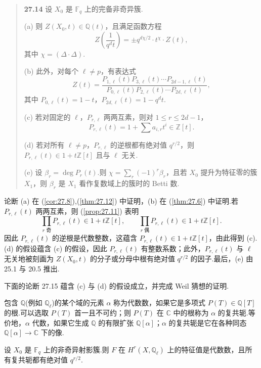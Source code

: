 \begin{quote}
\label{item:27.14}
\textbf{27.14} 设 $X_0$ 是 $\mathbb{F}_q$ 上的完备非奇异簇.

(a) 则 $Z(X_0, t) \in \mathbb{Q}(t)$，且满足函数方程
\[
Z\left( \frac{1}{q^{d}t} \right) = \pm q^{d\chi/2} \cdot t^{\chi} \cdot Z(t),
\]
其中 $\chi = (\Delta \cdot \Delta)$.

(b) 此外，对每个 $\ell \neq p$，有表达式
\[
Z(t) = \frac{P_{1, \ell}(t)P_{3, \ell}(t) \cdots P_{2d-1, \ell}(t)}{P_{0, \ell}(t)P_{2, \ell}(t) \cdots P_{2d, \ell}(t)},
\]
其中 $P_{0, \ell}(t) = 1 - t$，$P_{2d, \ell}(t) = 1 - q^{d}t$.

(c) 若对固定的 $\ell$，$P_{r, \ell}$ 两两互素，则对 $1 \leq r \leq 2d - 1$，
\[
P_{r, \ell}(t) = 1 + \sum a_{i, r}t^{i} \in \mathbb{Z}[t].
\]

(d) 若对所有 $\ell \neq p$，$P_{r, \ell}$ 的逆根都有绝对值 $q^{r/2}$，则 $P_{r, \ell}(t) \in 1 + t\mathbb{Z}[t]$ 且与 $\ell$ 无关.

(e) 设 $\beta_r = \deg P_r(t)$.则 $\chi = \sum_{r} (-1)^{r}\beta_r$，且若 $X_0$ 提升为特征零的簇 $X_1$，则 $\beta_r$ 是 $X_1$ 看作复数域上的簇时的 Betti 数.
\end{quote}

论断 (a) 在 (\ref{cor:27.8}),(\ref{thm:27.12}) 中证明，(b) 在 (\ref{thm:27.6}) 中证明.若 $P_{r, \ell}(t)$ 两两互素，则 (\ref{prop:27.11}) 表明
\[
\prod_{r \text{ 奇}} P_{r, \ell}(t) \in 1 + t\mathbb{Z}[t], \qquad \prod_{r \text{ 偶}} P_{r, \ell}(t) \in 1 + t\mathbb{Z}[t].
\]
因此 $P_{r, \ell}(t)$ 的逆根是代数整数，这蕴含 $P_{r, \ell}(t) \in 1 + t\mathbb{Z}[t]$，由此得到 (c).(d) 的假设蕴含 (c) 的假设，因此 $P_{r, \ell}(t)$ 有整数系数；此外，$P_{r, \ell}(t)$ 与 $\ell$ 无关地被刻画为 $Z(X_0, t)$ 的分子或分母中根有绝对值 $q^{r/2}$ 的因子.最后，(e) 由 25.1 与 20.5 推出.

下面的论断 27.15 蕴含 (c) 与 (d) 的假设成立，并完成 Weil 猜想的证明.

包含 $\mathbb{Q}$(例如 $\mathbb{Q}_{\ell}$)的某个域的元素 $\alpha$ 称为代数数，如果它是多项式 $P(T) \in \mathbb{Q}[T]$ 的根.可以选取 $P(T)$ 首一且不可约；则 $P(T)$ 在 $\mathbb{C}$ 中的根称为 $\alpha$ 的复共轭.等价地，$\alpha$ 代数，如果它生成 $\mathbb{Q}$ 的有限扩张 $\mathbb{Q}[\alpha]$；$\alpha$ 的复共轭是它在各种同态 $\mathbb{Q}[\alpha] \to \mathbb{C}$ 下的像.

\begin{theorem}\label{thm:27.15}
设 $X_0$ 是 $\mathbb{F}_q$ 上的非奇异射影簇.则 $F$ 在 $H^{r}(X, \mathbb{Q}_{\ell})$ 上的特征值是代数数，且所有复共轭都有绝对值 $q^{r/2}$.
\end{theorem}

